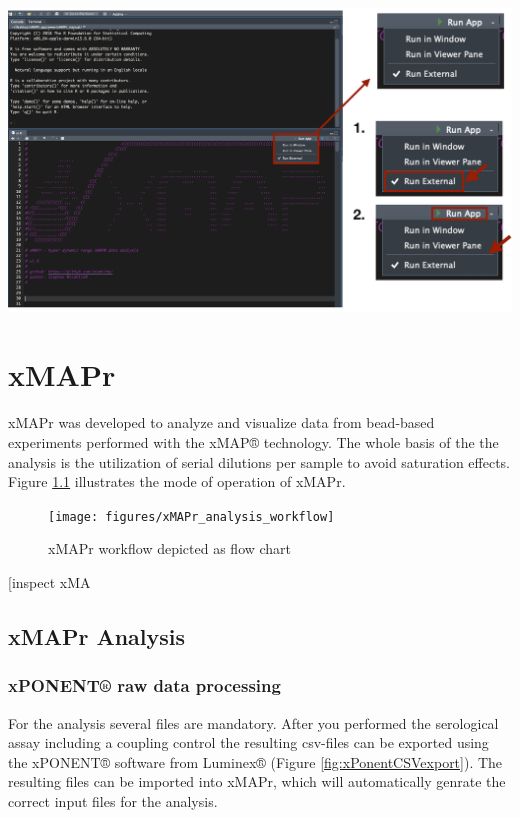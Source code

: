 \documentclass[]{book}
\theoremstyle{definition}
\theoremstyle{definition}
\theoremstyle{definition}
\theoremstyle{remark}
\begin{document}
\begin{center}\includegraphics[width=27.78in]{figures/run_app_locally} \end{center}

\chapter{xMAPr}\label{xmapr}

xMAPr was developed to analyze and visualize data from bead-based
experiments performed with the xMAP® technology. The whole basis of the
the analysis is the utilization of serial dilutions per sample to avoid
saturation effects. Figure \ref{fig:xMAPrWorkflow} illustrates the mode
of operation of xMAPr.

\begin{figure}

{\centering \texttt{[image: figures/xMAPr\_analysis\_workflow]} 

}

\caption{xMAPr workflow depicted as flow chart}\label{fig:xMAPrWorkflow}
\end{figure}

{[}inspect xMA

\section{xMAPr Analysis}\label{xmapr-analysis}

\subsection{xPONENT® raw data
processing}\label{xponent-raw-data-processing}

For the analysis several files are mandatory. After you performed the
serological assay including a coupling control the resulting csv-files
can be exported using the xPONENT® software from Luminex® (Figure
\ref{fig:xPonentCSVexport}). The resulting files can be imported into
xMAPr, which will automatically genrate the correct input files for the
analysis.
\end{document}
